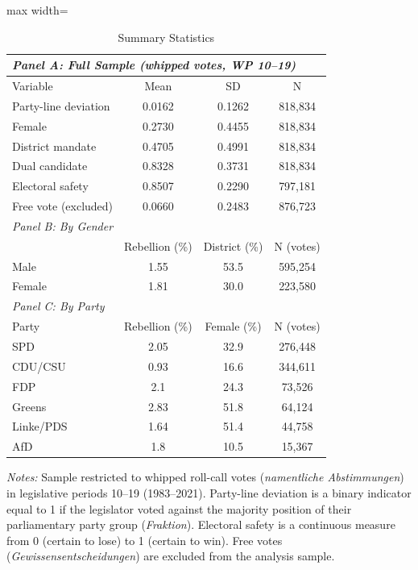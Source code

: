 \begin{table}[htbp]
\centering
\caption{Summary Statistics}
\label{tab:summary}
\begin{adjustbox}{max width=\textwidth}
\begin{tabular}{lccc}
\toprule
\multicolumn{4}{l}{\textit{Panel A: Full Sample (whipped votes, WP 10--19)}} \\
\midrule
Variable & Mean & SD & N \\
\midrule
Party-line deviation & 0.0162 & 0.1262 & 818,834 \\
Female & 0.2730 & 0.4455 & 818,834 \\
District mandate & 0.4705 & 0.4991 & 818,834 \\
Dual candidate & 0.8328 & 0.3731 & 818,834 \\
Electoral safety & 0.8507 & 0.2290 & 797,181 \\
Free vote (excluded) & 0.0660 & 0.2483 & 876,723 \\
\midrule
\multicolumn{4}{l}{\textit{Panel B: By Gender}} \\
\midrule
 & Rebellion (\%) & District (\%) & N (votes) \\
\midrule
Male & 1.55 & 53.5 & 595,254 \\
Female & 1.81 & 30.0 & 223,580 \\
\midrule
\multicolumn{4}{l}{\textit{Panel C: By Party}} \\
\midrule
Party & Rebellion (\%) & Female (\%) & N (votes) \\
\midrule
SPD & 2.05 & 32.9 & 276,448 \\
CDU/CSU & 0.93 & 16.6 & 344,611 \\
FDP & 2.1 & 24.3 & 73,526 \\
Greens & 2.83 & 51.8 & 64,124 \\
Linke/PDS & 1.64 & 51.4 & 44,758 \\
AfD & 1.8 & 10.5 & 15,367 \\
\bottomrule
\end{tabular}
\end{adjustbox}
\begin{minipage}{0.95\textwidth}
\footnotesize
\textit{Notes:} Sample restricted to whipped roll-call votes (\textit{namentliche Abstimmungen}) in legislative periods 10--19 (1983--2021). Party-line deviation is a binary indicator equal to 1 if the legislator voted against the majority position of their parliamentary party group (\textit{Fraktion}). Electoral safety is a continuous measure from 0 (certain to lose) to 1 (certain to win). Free votes (\textit{Gewissensentscheidungen}) are excluded from the analysis sample.
\end{minipage}
\end{table}
